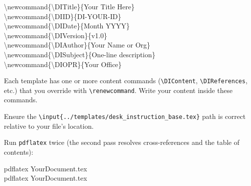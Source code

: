 {\begin{enumerate}
\par\vspace{4pt}\noindent\colorbox{diBgLight}{\begin{minipage}{\dimexpr\linewidth-12pt\relax}\small\ttfamily
\textbackslash{}newcommand\{\textbackslash{}DITitle\}\{Your Title Here\}\\
  \textbackslash{}newcommand\{\textbackslash{}DIID\}\{DI-YOUR-ID\}\\
  \textbackslash{}newcommand\{\textbackslash{}DIDate\}\{Month YYYY\}\\
  \textbackslash{}newcommand\{\textbackslash{}DIVersion\}\{v1.0\}\\
  \textbackslash{}newcommand\{\textbackslash{}DIAuthor\}\{Your Name or Org\}\\
  \textbackslash{}newcommand\{\textbackslash{}DISubject\}\{One-line description\}\\
  \textbackslash{}newcommand\{\textbackslash{}DIOPR\}\{Your Office\}\\
\end{minipage}}\par\vspace{4pt}


Each template has one or more content commands (\texttt{\textbackslash{}DIContent}, \texttt{\textbackslash{}DIReferences}, etc.) that you override with \texttt{\textbackslash{}renewcommand}. Write your content inside these commands.

Ensure the \texttt{\textbackslash{}input\{../templates/desk\_instruction\_base.tex\}} path is correct relative to your file's location.


Run \texttt{pdflatex} twice (the second pass resolves cross-references and the table of contents):

\par\vspace{4pt}\noindent\colorbox{diBgLight}{\begin{minipage}{\dimexpr\linewidth-12pt\relax}\small\ttfamily
pdflatex YourDocument.tex\\
  pdflatex YourDocument.tex\\
\end{minipage}}\par\vspace{4pt}



\end{enumerate}}
